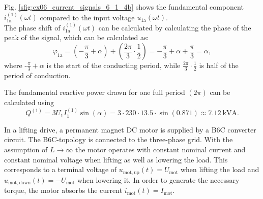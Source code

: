\begin{solutionblock}
        Fig. \ref{sfig:ex06_current_signals_6_1_4b} shows the fundamental component $i^\mathrm{(1)}_\mathrm{1a}(\omega t)$ compared to the input voltage $u_\mathrm{1a}(\omega t)$.
        \\
        The phase shift of $i^\mathrm{(1)}_\mathrm{1a}(\omega t)$ can be calculated by calculating the phase of the peak of the signal, which can be calculated as: 
        \begin{equation}
            \varphi_\mathrm{1a} = (-\frac{\pi}{3} + \alpha) + (\frac{2\pi}{3} \cdot \frac{1}{2}) = -\frac{\pi}{3} + \alpha + \frac{\pi}{3} = \alpha,   
        \end{equation}
        where -$\frac{\pi}{3} + \alpha$ is the start of the conducting period, while $\frac{2\pi}{3} \cdot \frac{1}{2}$ is half of the period of conduction.
        

    \end{solutionblock}
    \begin{solutionblock}
        The fundamental reactive power drawn for one full period $(2\pi)$ can be calculated using
        \begin{equation}
            Q^\mathrm{(1)} = 3 U_1 I^\mathrm{(1)}_1 \sin(\alpha)  = 3 \cdot 230 \cdot 13.5 \cdot \sin(0.871) \approx \SI{7.12}{\kilo \volt \ampere}. 
        \end{equation}
    \end{solutionblock}

In a lifting drive, a permanent magnet DC motor is supplied by a B6C converter circuit. The B6C-topology is connected to the three-phase grid.
With the assumption of $L\rightarrow\infty$ the motor operates with constant nominal current and constant nominal voltage when lifting as well as lowering the load.
This corresponds to a terminal voltage of $u_\mathrm{mot,up}(t)=U_\mathrm{mot}$ when lifting the load and $u_\mathrm{mot,down}(t)=-U_\mathrm{mot}$ when lowering it.
In order to generate the necessary torque, the motor absorbs the current $i_\mathrm{mot}(t)=I_\mathrm{mot}$.



